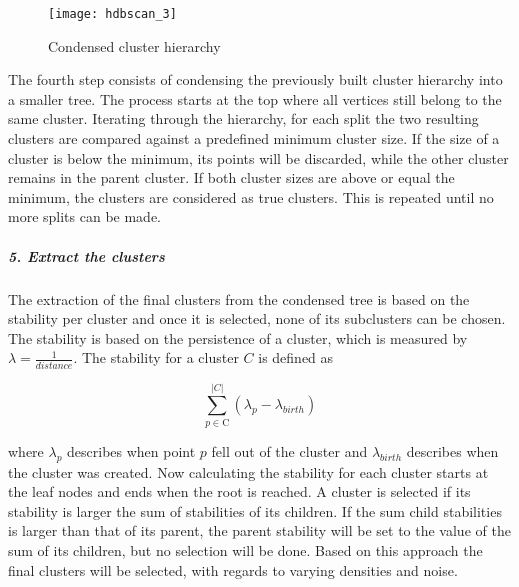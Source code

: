 \begin{figure}[h]
    \centering
    \texttt{[image: hdbscan\_3]}
    \caption{Condensed cluster hierarchy}
    \label{fig:hdbscan_3}
\end{figure}

The fourth step consists of condensing the previously built cluster hierarchy into a smaller tree. The process starts at the top where all vertices still belong to the same cluster. Iterating through the hierarchy, for each split the two resulting clusters are compared against a predefined minimum cluster size. If the size of a cluster is below the minimum, its points will be discarded, while the other cluster remains in the parent cluster. If both cluster sizes are above or equal the minimum, the clusters are considered as true clusters. This is repeated until no more splits can be made. 


\subparagraph{5. Extract the clusters}

The extraction of the final clusters from the condensed tree is based on the stability per cluster and once it is selected, none of its subclusters can be chosen. The stability is based on the persistence of a cluster, which is measured by $\lambda = \frac{1}{distance}$. The stability for a cluster $C$ is defined as

\begin{equation}
\sum_{p \in \text{C}}^{|C|} ({\lambda}_{p} - {\lambda}_{birth})
\end{equation}

 where ${\lambda}_{p}$ describes when point $p$ fell out of the cluster and $ {\lambda}_{birth}$ describes when the cluster was created. Now calculating the stability for each cluster starts at the leaf nodes and ends when the root is reached. A cluster is selected if its stability is larger the sum of stabilities of its children. If the sum child stabilities is larger than that of its parent, the parent stability will be set to the value of the sum of its children, but no selection will be done. Based on this approach the final clusters will be selected, with regards to varying densities and noise.